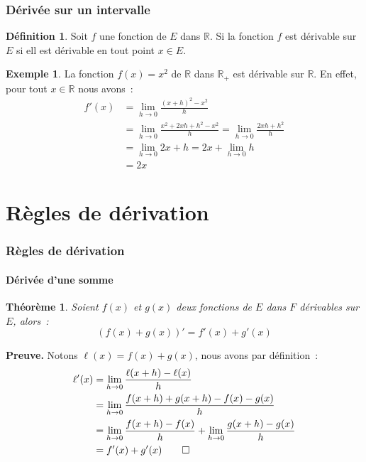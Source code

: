 \documentclass[10pt,notheorems]{beamer}
\theoremstyle{plain}
\newtheorem{theorem}{Théorème}
\theoremstyle{definition} %
\newtheorem{definition}{Définition}
\newtheorem{example}{Exemple}
\begin{document}
\begin{frame}
  \frametitle{Dérivée sur un intervalle}
  \hypertarget{slide_derivee_7}{}


  \begin{definition}\label{dfn:derivable-intervalle}
    Soit $f$ une fonction de $E$ dans $\mathbb R$. Si la fonction $f$ est dérivable sur $E$ si ell est dérivable en tout point  $x\in E$.
  \end{definition}

  \bigskip

  \begin{example}
    La fonction $f(x) = x^2$ de $\mathbb R$ dans $\mathbb R_+$ est dérivable sur $\mathbb R$. En effet, pour tout $x\in\mathbb R$ nous avons~:
    \[
      \begin{split}
        f'(x) &= \lim_{h\rightarrow 0}\frac{(x+h)^2-x^2}{h}\\
        &= \lim_{h\rightarrow 0}\frac{x^2+2xh+h^2-x^2}{h} = \lim_{h\rightarrow 0}\frac{2xh+h^2}{h}\\
        &= \lim_{h\rightarrow 0} 2x+h = 2x + \lim_{h\rightarrow 0} h\\
        &= 2x
      \end{split}
    \]

  \end{example}

\end{frame}


\section{Règles de dérivation}


\begin{frame}
  \frametitle{Règles de dérivation}
  \framesubtitle{Dérivée d'une somme}
  \hypertarget{slide_derivee_somme_1}{}

  \begin{theorem}
    Soient $f(x)$ et $g(x)$ deux fonctions de $E$ dans $F$ dérivables sur $E$, alors~:
    \[
      (f(x)+g(x))' = f'(x) + g'(x)
    \]
  \end{theorem}

  \bigskip

  {\small \textbf{Preuve.} Notons $\ell(x) = f(x)+g(x)$, nous avons par définition~:
    \[
      \begin{split}
        \ell'(x) &= \lim_{h\rightarrow 0} \frac{\ell(x+h)-\ell(x)}{h}\\
        &= \lim_{h\rightarrow 0} \frac{f(x+h)+g(x+h)-f(x)-g(x)}{h}\\
        &= \lim_{h\rightarrow 0} \frac{f(x+h)-f(x)}{h} + \lim_{h\rightarrow 0} \frac{g(x+h)-g(x)}{h}\\
        &= f'(x)+g'(x) \qed
      \end{split}
    \]
  }

\end{frame}
\end{document}
